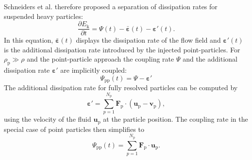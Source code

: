 \documentclass[11pt,a4paper,openany,oneside,parskip=half*]{article}
\renewcommand*\vec[1]{\boldsymbol{#1}}
\begin{document}
Schneiders et al. \cite{schneiders2017} therefore proposed a separation of dissipation rates for suspended heavy particles:
\begin{equation}
\frac{\partial E_\mathrm{k}}{\partial t} = \Psi (t) - \vec{\bar{\varepsilon}} (t) - \vec{\varepsilon}' (t).
\end{equation}
In this equation, $\vec{\bar{\varepsilon}} (t)$ displays the dissipation rate of the flow field and $\vec{\varepsilon}' (t)$ is the additional dissipation rate introduced by the injected point-particles. For $\rho_\mathrm{p} \gg \rho$ and the point-particle approach the coupling rate $\Psi$ and the additional dissipation rate $\vec{\varepsilon}'$ are implicitly coupled:
\begin{equation}
\Psi_\mathrm{pp} (t) = \Psi -\vec{\varepsilon}'
\end{equation}
The additional dissipation rate for fully resolved particles can be computed by
\begin{equation}
	\vec{\varepsilon}' = \sum_{p=1}^{N_\mathrm{p}} \vec{F}_\mathrm{p} \cdot (\vec{u}_\mathrm{p}-\vec{v}_\mathrm{p}),
\end{equation}
using the velocity of the fluid $\vec{u}_\mathrm{p}$ at the particle position.
The coupling rate in the special case of point particles then simplifies to 
\begin{equation}
\Psi_\mathrm{pp} (t) = \sum_{p=1}^{N_\mathrm{p}} \vec{F}_\mathrm{p} \cdot \vec{u}_\mathrm{p}.
\end{equation}
\newline
\end{document}
